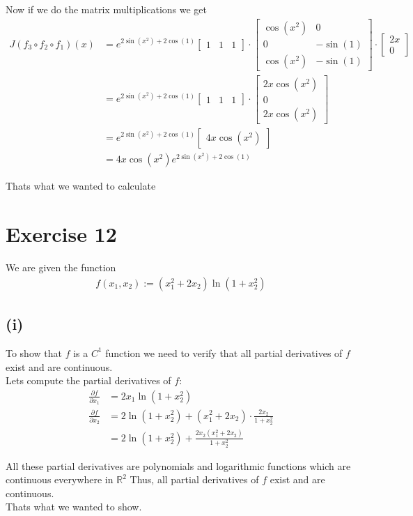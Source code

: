 \documentclass{article}
\begin{document}
Now if we do the matrix multiplications we get
\begin{align*}
   J(f_3 \circ f_2 \circ f_1)(x) &= e^{2\sin(x^2) + 2\cos(1)} \begin{bmatrix}
      1 & 1 & 1
   \end{bmatrix} \cdot \begin{bmatrix}
      \cos(x^2) & 0 \\
      0 & -\sin(1) \\
      \cos(x^2) & -\sin(1)
   \end{bmatrix} \cdot \begin{bmatrix}
      2x \\
      0
   \end{bmatrix} \\
   &= e^{2\sin(x^2) + 2\cos(1)} \begin{bmatrix}
      1 & 1 & 1
   \end{bmatrix} \cdot \begin{bmatrix}
      2x \cos(x^2) \\
      0 \\
      2x \cos(x^2)
   \end{bmatrix} \\
   &= e^{2\sin(x^2) + 2\cos(1)} \begin{bmatrix}
      4x \cos(x^2)
   \end{bmatrix} \\
   &= 4x \cos(x^2) e^{2\sin(x^2) + 2\cos(1)}
\end{align*}

Thats what we wanted to calculate

\section*{Exercise 12}
We are given the function
\begin{align*}
   f(x_1, x_2) := (x_1^2 + 2x_2) \ln(1 + x_2^2)
\end{align*}

\subsection*{(i)}
To show that \(f\) is a \(C^1\) function we need to verify that all partial derivatives of \(f\) exist and are continuous. \\
Lets compute the partial derivatives of \(f\):
\begin{align*}
   \frac{\partial f}{\partial x_1} &= 2x_1 \ln(1 + x_2^2) \\
   \frac{\partial f}{\partial x_2} &= 2 \ln(1 + x_2^2) + (x_1^2 + 2x_2) \cdot \frac{2x_2}{1 + x_2^2} \\
   &= 2 \ln(1 + x_2^2) + \frac{2x_2 (x_1^2 + 2x_2)}{1 + x_2^2}
\end{align*}

All these partial derivatives are polynomials and logarithmic functions which are continuous everywhere in \( \mathbb{R}^2 \)
Thus, all partial derivatives of \(f\) exist and are continuous. \\
Thats what we wanted to show.
\end{document}
